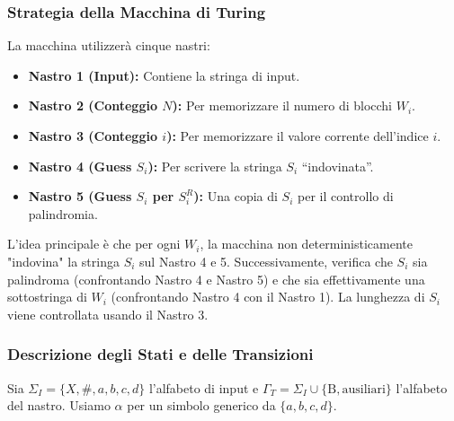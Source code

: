 \documentclass[a4paper]{article}
\newcommand{\B}{\text{B}} %
\begin{document}
\subsubsection{Strategia della Macchina di Turing}
La macchina utilizzerà cinque nastri:
\begin{itemize}
    \item \textbf{Nastro 1 (Input):} Contiene la stringa di input.
    \item \textbf{Nastro 2 (Conteggio $N$):} Per memorizzare il numero di blocchi $W_i$.
    \item \textbf{Nastro 3 (Conteggio $i$):} Per memorizzare il valore corrente dell'indice $i$.
    \item \textbf{Nastro 4 (Guess $S_i$):} Per scrivere la stringa $S_i$ ``indovinata''.
    \item \textbf{Nastro 5 (Guess $S_i$ per $S_i^R$):} Una copia di $S_i$ per il controllo di palindromia.
\end{itemize}

L'idea principale è che per ogni $W_i$, la macchina non deterministicamente "indovina" la stringa $S_i$ sul Nastro 4 e 5. Successivamente, verifica che $S_i$ sia palindroma (confrontando Nastro 4 e Nastro 5) e che sia effettivamente una sottostringa di $W_i$ (confrontando Nastro 4 con il Nastro 1). La lunghezza di $S_i$ viene controllata usando il Nastro 3.

\subsubsection{Descrizione degli Stati e delle Transizioni}
Sia $\Sigma_I = \{X, \#, a,b,c,d\}$ l'alfabeto di input e $\Gamma_T = \Sigma_I \cup \{\B, \text{ausiliari}\}$ l'alfabeto del nastro. Usiamo $\alpha$ per un simbolo generico da $\{a,b,c,d\}$.
\end{document}
